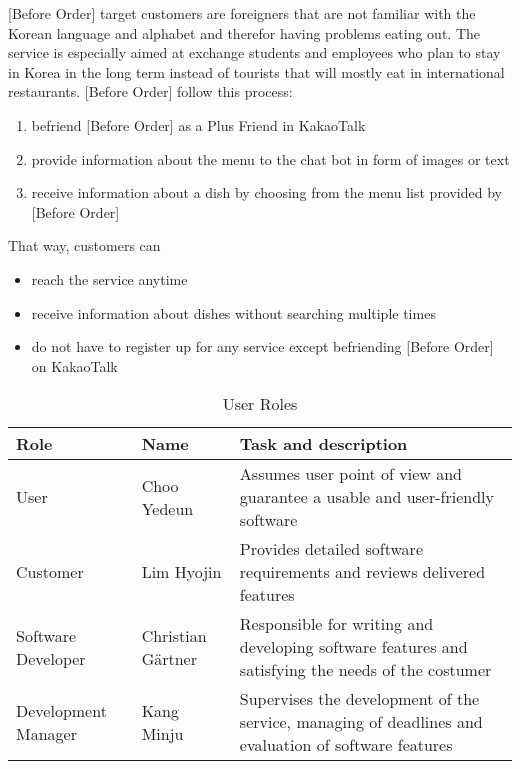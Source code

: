  [Before Order] target customers are foreigners that are not familiar with the Korean language and alphabet and therefor having problems eating out. The service is especially aimed at exchange students and employees who plan to stay in Korea in the long term instead of tourists that will mostly eat in international restaurants. [Before Order] follow this process: 
\begin{enumerate}
\item befriend [Before Order] as a Plus Friend in KakaoTalk
\item provide information about the menu to the chat bot in form of images or text
\item receive information about a dish by choosing from the menu list provided by [Before Order]
\end{enumerate}
That way, customers can 
\begin{itemize}
\item reach the service anytime
\item receive information about dishes without searching multiple times
\item do not have to register up for any service except befriending [Before Order] on KakaoTalk
\end{itemize}

\begin{table}
\caption{User Roles}
\begin{tabularx}{\linewidth}{|X|X|X|}
\toprule
Role                & Name              & Task and description \\
\midrule
User                & Choo Yedeun       & Assumes user point of view and guarantee a usable and user-friendly software \\
Customer            & Lim Hyojin        & Provides detailed software requirements and reviews delivered features \\
Software Developer  & Christian Gärtner & Responsible for writing and developing software features and satisfying the needs of the costumer    \\
Development Manager & Kang Minju        & Supervises the development of the service, managing of deadlines and evaluation of software features
\end{tabularx}
\end{table}